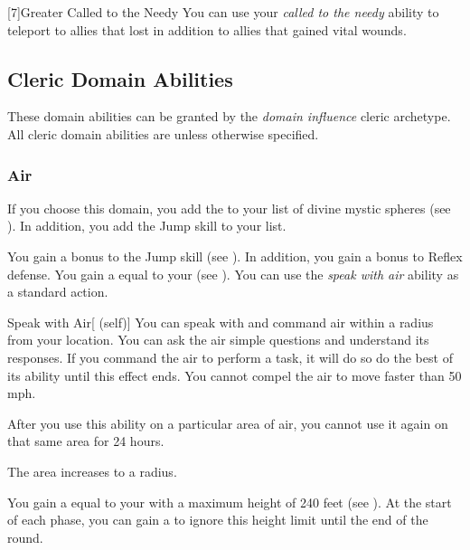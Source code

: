         [7]{Greater Called to the Needy} You can use your \textit{called to the needy} ability to teleport to allies that lost  in addition to allies that gained vital wounds.

    \newpage
    \subsection{Cleric Domain Abilities}\label{Cleric Domain Abilities}
        These domain abilities can be granted by the \textit{domain influence} cleric archetype.
        All cleric domain abilities are  unless otherwise specified.

        \subsubsection{Air}
            If you choose this domain, you add the   to your list of divine mystic spheres (see ).
            In addition, you add the Jump skill to your  list.

             You gain a  bonus to the Jump skill (see ).
            In addition, you gain a  bonus to Reflex defense.
             You gain a  equal to your  (see ).
             You can use the \textit{speak with air} ability as a standard action.
            \begin{attuneability}{Speak with Air}[ (self)]
                You can speak with and command air within a \areahuge radius  from your location.
                You can ask the air simple questions and understand its responses.
                If you command the air to perform a task, it will do so do the best of its ability until this effect ends.
                You cannot compel the air to move faster than 50 mph.

                After you use this ability on a particular area of air, you cannot use it again on that same area for 24 hours.

                \rankline
                 The area increases to a \areagarg radius.
            \end{attuneability}
             You gain a  equal to your  with a maximum height of 240 feet (see ).
            At the start of each phase, you can gain a  to ignore this height limit until the end of the round.

